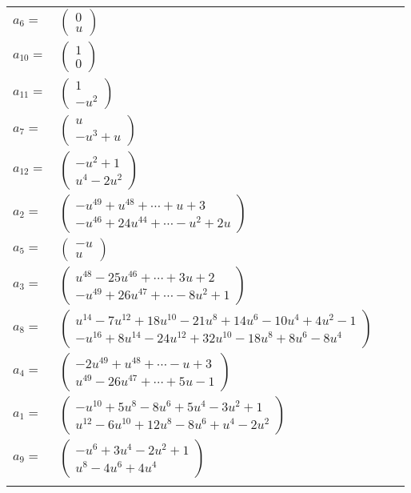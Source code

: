 \documentclass[1p]{elsarticle_modified}
\theoremstyle{definition}
\begin{document}
\begin{tabular}{m{7pt} m{180pt} m{7pt} m{180pt} }
\flushright $a_{6}=$&$\begin{pmatrix}0\\u\end{pmatrix}$ \\
\flushright $a_{10}=$&$\begin{pmatrix}1\\0\end{pmatrix}$ \\
\flushright $a_{11}=$&$\begin{pmatrix}1\\- u^2\end{pmatrix}$ \\
\flushright $a_{7}=$&$\begin{pmatrix}u\\- u^3+u\end{pmatrix}$ \\
\flushright $a_{12}=$&$\begin{pmatrix}- u^2+1\\u^4-2 u^2\end{pmatrix}$ \\
\flushright $a_{2}=$&$\begin{pmatrix}- u^{49}+u^{48}+\cdots+u+3\\- u^{46}+24 u^{44}+\cdots- u^2+2 u\end{pmatrix}$ \\
\flushright $a_{5}=$&$\begin{pmatrix}- u\\u\end{pmatrix}$ \\
\flushright $a_{3}=$&$\begin{pmatrix}u^{48}-25 u^{46}+\cdots+3 u+2\\- u^{49}+26 u^{47}+\cdots-8 u^2+1\end{pmatrix}$ \\
\flushright $a_{8}=$&$\begin{pmatrix}u^{14}-7 u^{12}+18 u^{10}-21 u^8+14 u^6-10 u^4+4 u^2-1\\- u^{16}+8 u^{14}-24 u^{12}+32 u^{10}-18 u^8+8 u^6-8 u^4\end{pmatrix}$ \\
\flushright $a_{4}=$&$\begin{pmatrix}-2 u^{49}+u^{48}+\cdots- u+3\\u^{49}-26 u^{47}+\cdots+5 u-1\end{pmatrix}$ \\
\flushright $a_{1}=$&$\begin{pmatrix}- u^{10}+5 u^8-8 u^6+5 u^4-3 u^2+1\\u^{12}-6 u^{10}+12 u^8-8 u^6+u^4-2 u^2\end{pmatrix}$ \\
\flushright $a_{9}=$&$\begin{pmatrix}- u^6+3 u^4-2 u^2+1\\u^8-4 u^6+4 u^4\end{pmatrix}$\\&\end{tabular}
\end{document}
